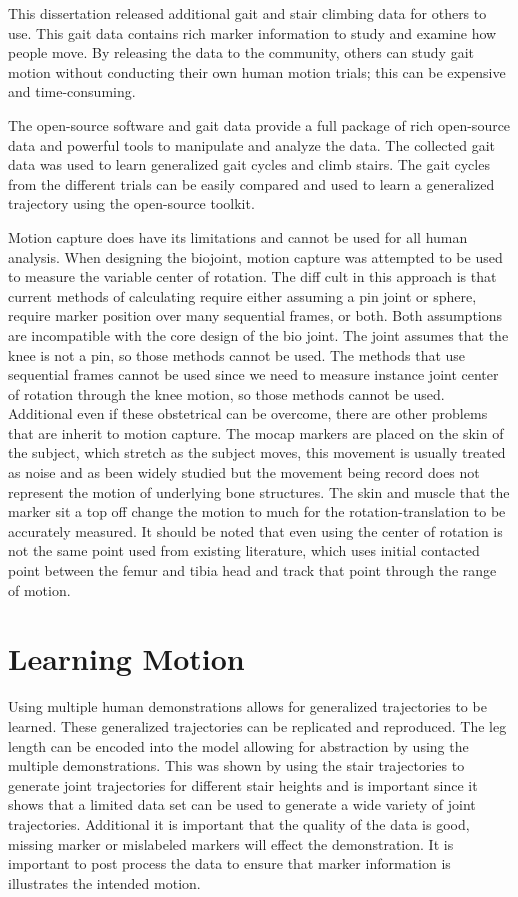 This dissertation released additional gait and stair climbing data for others to use. This gait data contains rich marker information to study and examine how people move. By releasing the data to the community, others can study gait motion without conducting their own human motion trials; this can be expensive and time-consuming. 

The open-source software and gait data provide a full package of rich open-source data and powerful tools to manipulate and analyze the data. The collected gait data was used to learn generalized gait cycles and climb stairs. The gait cycles from the different trials can be easily compared and used to learn a generalized trajectory using the open-source toolkit. 

Motion capture does have its limitations and cannot be used for all human analysis. When designing the biojoint, motion capture was attempted to be used to measure the variable center of rotation. The diff cult in this approach is that current methods of calculating require either assuming a pin joint or sphere, require marker position over many sequential frames, or both. Both assumptions are incompatible with the core design of the bio joint. The joint assumes that the knee is not a pin, so those methods cannot be used. The methods that use sequential frames cannot be used since we need to measure instance joint center of rotation through the knee motion, so those methods cannot be used.  Additional even if these obstetrical can be overcome, there are other problems that are inherit to motion capture. The mocap markers are placed on the skin of the subject, which stretch as the subject moves, this movement is usually treated as noise and as been widely studied but the movement being record does not represent the motion of underlying bone structures.  The skin and muscle that the marker sit a top off change the motion to much for the rotation-translation to be accurately measured. It should be noted that even using the center of rotation is not the same point used from existing literature, which uses initial contacted point between the femur and tibia head and track that point through the range of motion.

\section{Learning Motion}


Using multiple human demonstrations allows for generalized trajectories to be learned. These generalized trajectories can be replicated and reproduced. The leg length can be encoded into the model allowing for abstraction by using the multiple demonstrations. This was shown by using the stair trajectories to generate joint trajectories for different stair heights and is important since it shows that a limited data set can be used to generate a wide variety of joint trajectories. Additional it is important that the quality of the data is good, missing marker or mislabeled markers will effect the demonstration. It is important to post process the data to ensure that marker information is illustrates the intended motion. 

